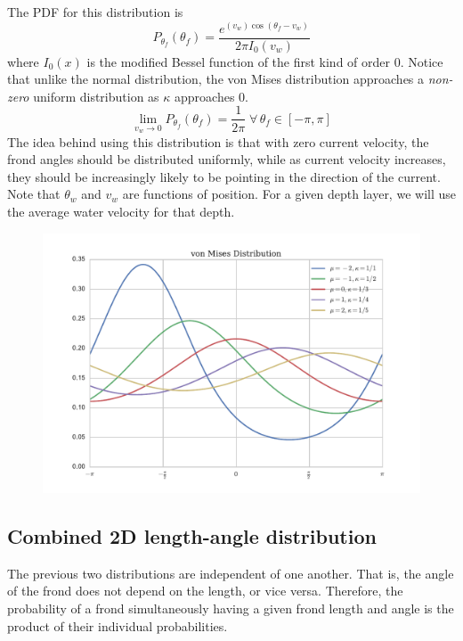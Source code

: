 The PDF for this distribution is
\begin{equation}
	P_{\theta_f}(\theta_f) = \frac{e^{(v_w)\cos(\theta_f-v_w)}}{2\pi I_0(v_w)}
\end{equation}
where $I_0(x)$ is the modified Bessel function of the first kind of order 0.
Notice that unlike the normal distribution, the von Mises distribution approaches a \textit{non-zero} uniform distribution as $\kappa$ approaches 0.
\begin{equation}
	\displaystyle \lim_{v_w \to 0}P_{\theta_f}(\theta_f) = \frac{1}{2\pi} \;\forall\, \theta_f \in [-\pi,\pi]
\end{equation}
The idea behind using this distribution is that with zero current velocity, the frond angles should be distributed uniformly, while as current velocity increases, they should be increasingly likely to be pointing in the direction of the current.
Note that $\theta_w$ and $v_w$ are functions of position.
For a given depth layer, we will use the average water velocity for that depth.

\begin{figure}[H]
	\centering
	\includegraphics[width=\linewidth]{vonmises_2}
	\label{fig:vonmises}
\end{figure}

\subsection{Combined 2D length-angle distribution}
\label{sec:2d_dist}
The previous two distributions are independent of one another. That is, the angle of the frond does not depend on the length, or vice versa.
Therefore, the probability of a frond simultaneously having a given frond length and angle is the product of their individual probabilities.

